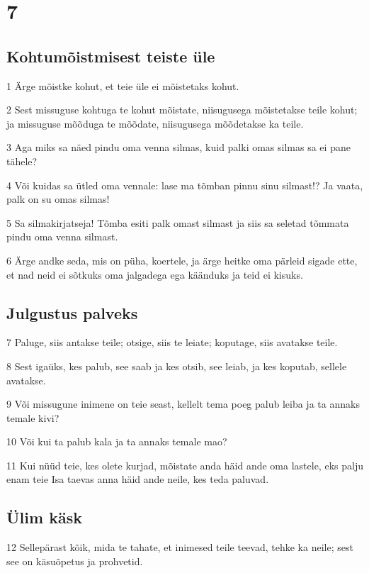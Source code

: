 \chapter{7}

\section*{Kohtumõistmisest teiste üle}

\par 1 Ärge mõistke kohut, et teie üle ei mõistetaks kohut.
\par 2 Sest missuguse kohtuga te kohut mõistate, niisugusega mõistetakse teile kohut; ja missuguse mõõduga te mõõdate, niisugusega mõõdetakse ka teile.
\par 3 Aga miks sa näed pindu oma venna silmas, kuid palki omas silmas sa ei pane tähele?
\par 4 Või kuidas sa ütled oma vennale: lase ma tõmban pinnu sinu silmast!? Ja vaata, palk on su omas silmas!
\par 5 Sa silmakirjatseja! Tõmba esiti palk omast silmast ja siis sa seletad tõmmata pindu oma venna silmast.
\par 6 Ärge andke seda, mis on püha, koertele, ja ärge heitke oma pärleid sigade ette, et nad neid ei sõtkuks oma jalgadega ega käänduks ja teid ei kisuks.

\section*{Julgustus palveks}

\par 7 Paluge, siis antakse teile; otsige, siis te leiate; koputage, siis avatakse teile.
\par 8 Sest igaüks, kes palub, see saab ja kes otsib, see leiab, ja kes koputab, sellele avatakse.
\par 9 Või missugune inimene on teie seast, kellelt tema poeg palub leiba ja ta annaks temale kivi?
\par 10 Või kui ta palub kala ja ta annaks temale mao?
\par 11 Kui nüüd teie, kes olete kurjad, mõistate anda häid ande oma lastele, eks palju enam teie Isa taevas anna häid ande neile, kes teda paluvad.

\section*{Ülim käsk}

\par 12 Sellepärast kõik, mida te tahate, et inimesed teile teevad, tehke ka neile; sest see on käsuõpetus ja prohvetid.

